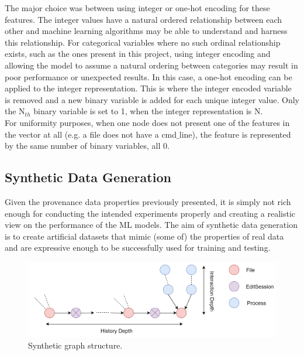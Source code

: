 The major choice was between using integer or one-hot encoding for these features. The integer values have a natural ordered relationship between each other and machine learning algorithms may be able to understand and harness this relationship. For categorical variables where no such ordinal relationship exists, such as the ones present in this project, using integer encoding and allowing the model to assume a natural ordering between categories may result in poor performance or unexpected results. In this case, a one-hot encoding can be applied to the integer representation. This is where the integer encoded variable is removed and a new binary variable is added for each unique integer value. Only the N$_{th}$ binary variable is set to 1, when the integer representation is N. \\

For uniformity purposes, when one node does not present one of the features in the vector at all (e.g. a file does not have a cmd$\_$line), the feature is represented by the same number of binary variables, all 0. 

\subsection{Synthetic Data Generation} \label{Synthetic Data Generation}

Given the provenance data properties previously presented, it is simply not rich enough for conducting the intended experiments properly and creating a realistic view on the performance of the ML models. The aim of synthetic data generation is to create artificial datasets that mimic (some of) the properties of real data and are expressive enough to be successfully used for training and testing. \\

\begin{figure}[H]
  \centering
  \centerline{\includegraphics[scale = 0.35]{Images/synth_dataset.png}}
  \caption{Synthetic graph structure.}
  \label{synth_dataset}
\end{figure}

